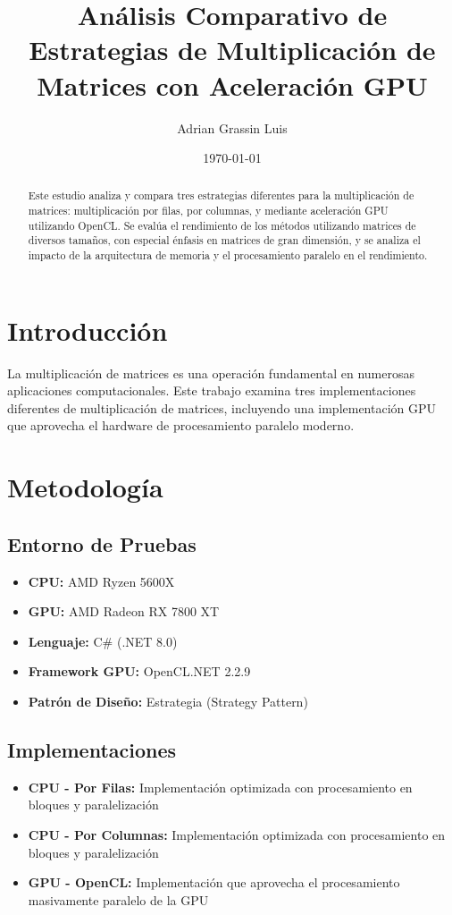 \documentclass[11pt]{article}
\begin{document}
\title{Análisis Comparativo de Estrategias de Multiplicación de Matrices con Aceleración GPU}
\author{Adrian Grassin Luis}
\date{\today}
\maketitle

\begin{abstract}
Este estudio analiza y compara tres estrategias diferentes para la multiplicación de matrices: multiplicación por filas, por columnas, y mediante aceleración GPU utilizando OpenCL. Se evalúa el rendimiento de los métodos utilizando matrices de diversos tamaños, con especial énfasis en matrices de gran dimensión, y se analiza el impacto de la arquitectura de memoria y el procesamiento paralelo en el rendimiento.
\end{abstract}

\section{Introducción}
La multiplicación de matrices es una operación fundamental en numerosas aplicaciones computacionales. Este trabajo examina tres implementaciones diferentes de multiplicación de matrices, incluyendo una implementación GPU que aprovecha el hardware de procesamiento paralelo moderno.

\section{Metodología}
\subsection{Entorno de Pruebas}
\begin{itemize}
    \item \textbf{CPU:} AMD Ryzen 5600X
    \item \textbf{GPU:} AMD Radeon RX 7800 XT
    \item \textbf{Lenguaje:} C\# (.NET 8.0)
    \item \textbf{Framework GPU:} OpenCL.NET 2.2.9
    \item \textbf{Patrón de Diseño:} Estrategia (Strategy Pattern)
\end{itemize}

\subsection{Implementaciones}
\begin{itemize}
    \item \textbf{CPU - Por Filas:} Implementación optimizada con procesamiento en bloques y paralelización
    \item \textbf{CPU - Por Columnas:} Implementación optimizada con procesamiento en bloques y paralelización
    \item \textbf{GPU - OpenCL:} Implementación que aprovecha el procesamiento masivamente paralelo de la GPU
\end{itemize}
\end{document}
